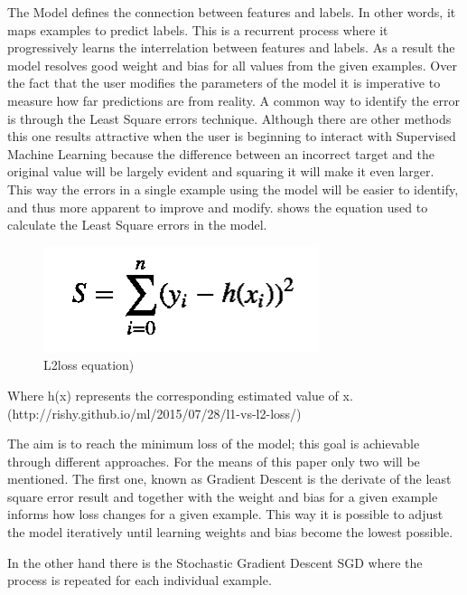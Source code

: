 The Model defines the connection between features and labels. In other words, it maps examples to predict labels. This is a recurrent process where it progressively learns the interrelation between features and labels. As a result the model resolves good weight and bias for all values from the given examples.  Over the fact that the user modifies the parameters of the model it is imperative to measure how far predictions are from reality.  A common way to identify the error is through the Least Square errors technique. Although there are other methods this one results attractive when the user is beginning to interact with Supervised Machine Learning because the difference between an incorrect target and the original value will be largely evident and squaring it will make it even larger. This way the errors in a single example using the model will be easier to identify, and thus more apparent to improve and modify. shows the equation used to calculate the Least Square errors in the model.


\begin{figure}[htbp]
  \centering
  \includegraphics[width=\textwidth]{images/equation1}
  \caption{L2loss equation)}
  \label{fig:L2loss equation}
\end{figure}


Where h(x) represents the corresponding estimated value of x. (http://rishy.github.io/ml/2015/07/28/l1-vs-l2-loss/)

The aim is to reach the minimum loss of the model; this goal is achievable through different approaches. For the means of this paper only two will be mentioned. The first one, known as Gradient Descent is the derivate of the least square error result and together with the weight and bias for a given example informs how loss changes for a given example. This way it is possible to adjust the model iteratively until learning weights and bias become the lowest possible. 

In the other hand there is the Stochastic Gradient Descent \ac{SGD} where the process is repeated for each individual example.

